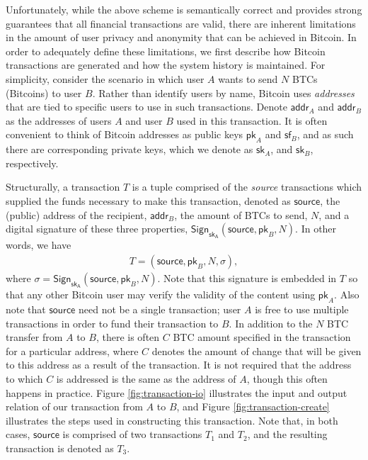 Unfortunately, while the above scheme is semantically correct and provides strong guarantees that all financial transactions are valid, there are inherent limitations in the amount of user privacy and anonymity that can be achieved in Bitcoin. In order to adequately define these limitations, we first describe how Bitcoin transactions are generated and how the system history is maintained. For simplicity, consider the scenario in which user $A$ wants to send $N$ BTCs (Bitcoins) to user $B$. Rather than identify users by name, Bitcoin uses \emph{addresses} that are tied to specific users to use in such transactions. Denote $\mathsf{addr}_A$ and $\mathsf{addr}_B$ as the addresses of users $A$ and user $B$ used in this transaction. It is often convenient to think of Bitcoin addresses as public keys $\mathsf{pk}_A$ and $\mathsf{sf}_B$, and as such there are corresponding private keys, which we denote as $\mathsf{sk}_A$, and $\mathsf{sk}_B$, respectively.

Structurally, a transaction $T$ is a tuple comprised of the \emph{source} transactions which supplied the funds necessary to make this transaction, denoted as $\mathsf{source}$, the (public) address of the recipient, $\mathsf{addr}_B$, the amount of BTCs to send, $N$, and a digital signature of these three properties, $\mathsf{Sign}_{\mathsf{sk_A}}({\mathsf{source}, \mathsf{pk}_B, N})$. In other words, we have 
\begin{align*}
T = (\mathsf{source}, \mathsf{pk}_B, N, \sigma), 
\end{align*}
where $\sigma = \mathsf{Sign}_{\mathsf{sk_A}}({\mathsf{source}, \mathsf{pk}_B, N})$. Note that this signature is embedded in $T$ so that any other Bitcoin user may verify the validity of the content using $\mathsf{pk}_A$. Also note that $\mathsf{source}$ need not be a single transaction; user $A$ is free to use multiple transactions in order to fund their transaction to $B$. In addition to the $N$ BTC transfer from $A$ to $B$, there is often $C$ BTC amount specified in the transaction for a particular address, where $C$ denotes the amount of change that will be given to this address as a result of the transaction. It is not required that the address to which $C$ is addressed is the same as the address of $A$, though this often happens in practice. Figure \ref{fig:transaction-io} illustrates the input and output relation of our transaction from $A$ to $B$, and Figure \ref{fig:transaction-create} illustrates the steps used in constructing this transaction. Note that, in both cases, $\mathsf{source}$ is comprised of two transactions $T_1$ and $T_2$, and the resulting transaction is denoted as $T_3$.

